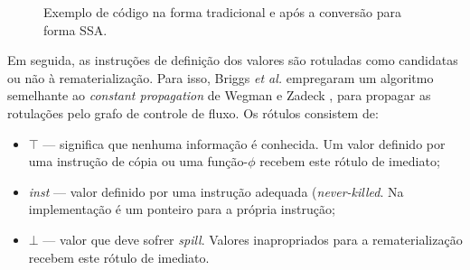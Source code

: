 \documentclass[
	12pt,				%
	openright,			%
	twoside,			%
	a4paper,			%
	tcc,			%
	]{ABNT-DC-UEL}
\begin{document}
\begin{figure}[hbt]
\begin{subfigure}{0.40\textwidth}
{}
    \end{subfigure}
    \caption{Exemplo de código na forma tradicional e após a conversão para forma SSA.}
    \label{fig:ssa}
\end{figure}

Em seguida, as instruções de definição dos valores são rotuladas como candidatas ou não à rematerialização. Para isso, Briggs \textit{et al.} empregaram um algoritmo semelhante ao \textit{constant propagation} de Wegman e Zadeck \cite{wegman:91}, para propagar as rotulações pelo grafo de controle de fluxo. Os rótulos consistem de:
\begin{itemize}
    \item $\top$ --- significa que nenhuma informação é conhecida. Um valor definido por uma instrução de cópia ou uma função-$\phi$ recebem este rótulo de imediato;
    \item \textit{inst} --- valor definido por uma instrução adequada (\textit{never-killed}. Na implementação é um ponteiro para a própria instrução;
    \item $\bot$ --- valor que deve sofrer \textit{spill}. Valores inapropriados para a rematerialização recebem este rótulo de imediato.
\end{itemize}
\end{document}
